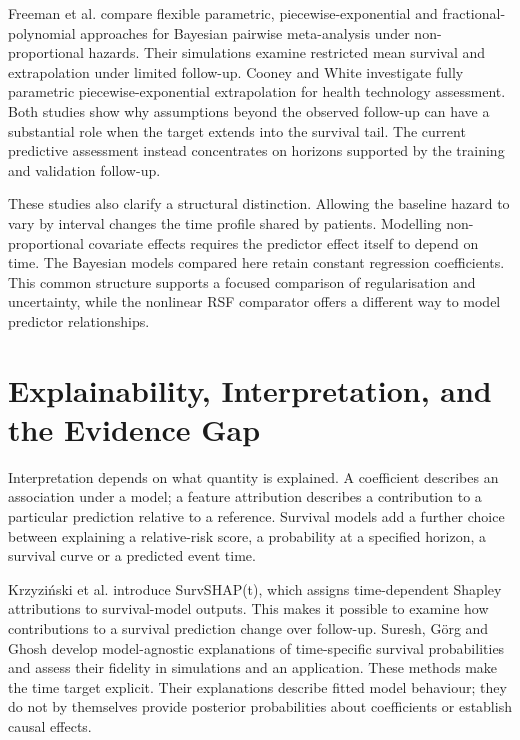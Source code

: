 Freeman et al. \cite{ref92} compare flexible parametric, piecewise-exponential and fractional-polynomial approaches for Bayesian pairwise meta-analysis under non-proportional hazards. Their simulations examine restricted mean survival and extrapolation under limited follow-up. Cooney and White \cite{ref93} investigate fully parametric piecewise-exponential extrapolation for health technology assessment. Both studies show why assumptions beyond the observed follow-up can have a substantial role when the target extends into the survival tail. The current predictive assessment instead concentrates on horizons supported by the training and validation follow-up.

These studies also clarify a structural distinction. Allowing the baseline hazard to vary by interval changes the time profile shared by patients. Modelling non-proportional covariate effects requires the predictor effect itself to depend on time. The Bayesian models compared here retain constant regression coefficients. This common structure supports a focused comparison of regularisation and uncertainty, while the nonlinear RSF comparator offers a different way to model predictor relationships.

\section{Explainability, Interpretation, and the Evidence Gap}\label{explainability-interpretation-and-the-evidence-gap}

Interpretation depends on what quantity is explained. A coefficient describes an association under a model; a feature attribution describes a contribution to a particular prediction relative to a reference. Survival models add a further choice between explaining a relative-risk score, a probability at a specified horizon, a survival curve or a predicted event time.

Krzyziński et al. \cite{ref30} introduce SurvSHAP(t), which assigns time-dependent Shapley attributions to survival-model outputs. This makes it possible to examine how contributions to a survival prediction change over follow-up. Suresh, Görg and Ghosh \cite{ref60} develop model-agnostic explanations of time-specific survival probabilities and assess their fidelity in simulations and an application. These methods make the time target explicit. Their explanations describe fitted model behaviour; they do not by themselves provide posterior probabilities about coefficients or establish causal effects.

